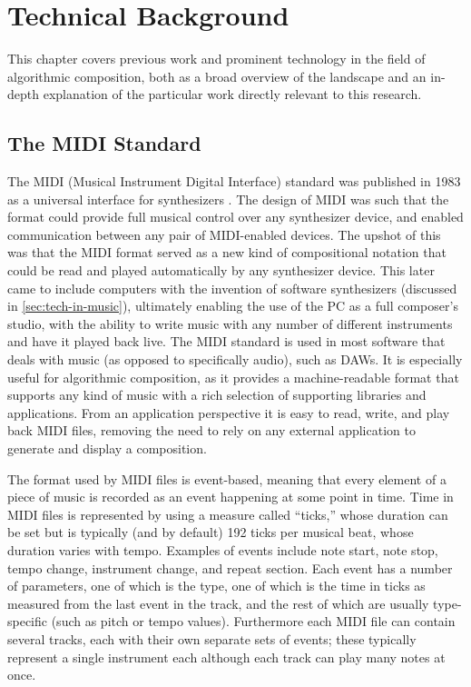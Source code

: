 \documentclass[ author={Stephen Livermore-Tozer},
				supervisor={Dr. Peter Flach},
				degree={MEng},
				title={Algorithmic Co-composition Using Machine Learning},
				subtitle={},
				type={research},
				year={2016} ]{dissertation}
\begin{document}
	
	\chapter{Technical Background}
	\label{chap:technical}
	
	This chapter covers previous work and prominent technology in the field of algorithmic composition, both as a broad overview of the landscape and an in-depth explanation of the particular work directly relevant to this research.
	
	\section{The MIDI Standard}
	\label{sec:midi}
	
	The MIDI (Musical Instrument Digital Interface) standard was published in 1983 as a universal interface for synthesizers  \cite{swift1997brief}. The design of MIDI was such that the format could provide full musical control over any synthesizer device, and enabled communication between any pair of MIDI-enabled devices. The upshot of this was that the MIDI format served as a new kind of compositional notation that could be read and played automatically by any synthesizer device. This later came to include computers with the invention of software synthesizers (discussed in \ref{sec:tech-in-music}), ultimately enabling the use of the PC as a full composer's studio, with the ability to write music with any number of different instruments and have it played back live. 
	The MIDI standard is used in most software that deals with music (as opposed to specifically audio), such as DAWs. It is especially useful for algorithmic composition, as it provides a machine-readable format that supports any kind of music with a rich selection of supporting libraries and applications. From an application perspective it is easy to read, write, and play back MIDI files, removing the need to rely on any external application to generate and display a composition. 
	
	The format used by MIDI files is event-based, meaning that every element of a piece of music is recorded as an event happening at some point in time. Time in MIDI files is represented by using a measure called ``ticks,'' whose duration can be set but is typically (and by default) 192 ticks per musical beat, whose duration varies with tempo. Examples of events include note start, note stop, tempo change, instrument change, and repeat section. Each event has a number of parameters, one of which is the type, one of which is the time in ticks as measured from the last event in the track, and the rest of which are usually type-specific (such as pitch or tempo values). Furthermore each MIDI file can contain several tracks, each with their own separate sets of events; these typically represent a single instrument each although each track can play many notes at once. 
	
\end{document}
